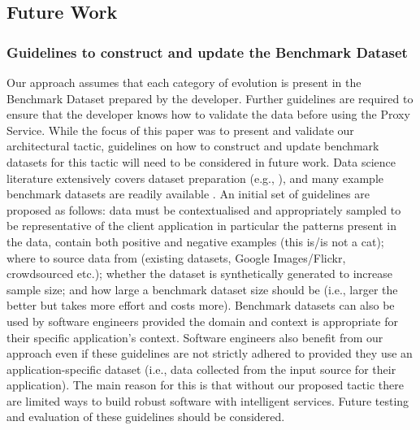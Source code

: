 \subsection{Future Work}

\subsubsection{Guidelines to construct and update the Benchmark Dataset}
\label{fse2020:sec:future-work:guidelines}
Our approach assumes that each category of evolution is present in the Benchmark Dataset prepared by the developer. Further guidelines are required to ensure that the developer knows how to validate the data before using the Proxy Service. While the focus of this paper was to present and validate our architectural tactic, guidelines on how to construct and update benchmark datasets for this tactic will need to be considered in future work. Data science literature extensively covers dataset preparation (e.g., \citep{pyle1999data,Krig2016}), and many example benchmark datasets are readily available \citep{wiki:dataset-list,guo2016ms,10.1145/2370216.2370437}. An initial set of guidelines are proposed as follows: data must be contextualised and appropriately sampled to be representative of the client application in particular the patterns present in the data, contain both positive and negative examples (this is/is not a cat); where to source data from (existing datasets, Google Images/Flickr, crowdsourced etc.); whether the dataset is synthetically generated to increase sample size; and how large a benchmark dataset size should be (i.e., larger the better but takes more effort and costs more). Benchmark datasets can also be used by software engineers provided the domain and context is appropriate for their specific application's context. Software engineers also benefit from our approach even if these guidelines are not strictly adhered to provided they use an application-specific dataset (i.e., data collected from the input source for their application). The main reason for this is that without our proposed tactic there are limited ways to build robust software with intelligent services. Future testing and evaluation of these guidelines should be considered.

